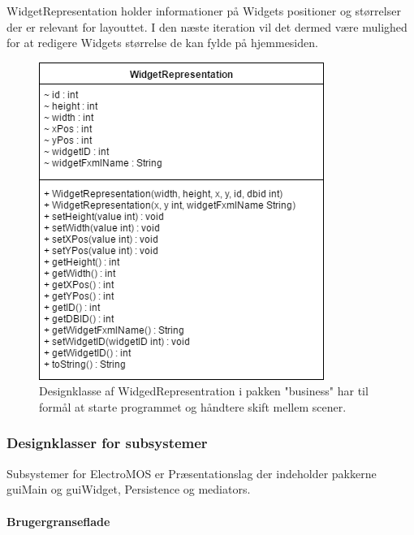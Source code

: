 WidgetRepresentation holder informationer på Widgets positioner og størrelser der er relevant for layouttet. I den næste iteration vil det dermed være mulighed for at redigere Widgets størrelse de kan fylde på hjemmesiden.

          \begin{figure}[H]
      \includegraphics[width=\linewidth]{elaborationsdokumentet/figurer/design/designklasser/Designklasse-WidgetRepresentation.png}
      \caption{Designklasse af WidgedRepresentration i pakken "business" har til formål at starte programmet og håndtere skift mellem scener.}
      \label{Designklasse-WidgedRepresentration}
  \end{figure}

\subsubsection{Designklasser for subsystemer}
Subsystemer for ElectroMOS er Præsentationslag der indeholder pakkerne guiMain og guiWidget, Persistence 
og mediators.


\FloatBarrier
\paragraph{Brugergranseflade}

